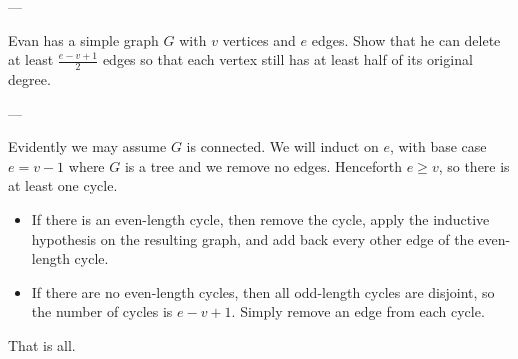 
---

Evan has a simple graph $G$ with $v$ vertices and $e$ edges. Show that he can delete at least $\frac{e-v+1}2$ edges so that each vertex still has at least half of its original degree.

---

Evidently we may assume $G$ is connected. We will induct on $e$, with base case $e=v-1$ where $G$ is a tree and we remove no edges. Henceforth $e\ge v$, so there is at least one cycle.
\begin{itemize}
    \item If there is an even-length cycle, then remove the cycle, apply the inductive hypothesis on the resulting graph, and add back every other edge of the even-length cycle.
    \item If there are no even-length cycles, then all odd-length cycles are disjoint, so the number of cycles is $e-v+1$. Simply remove an edge from each cycle.
\end{itemize}
That is all.

